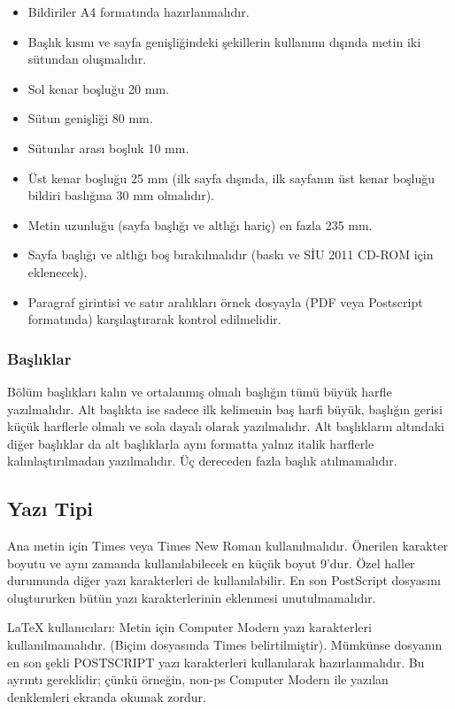 \documentclass{article}
\begin{document}
\begin{itemize}
\item Bildiriler A4 formatında hazırlanmalıdır.
\item Başlık kısmı ve sayfa genişliğindeki şekillerin kullanımı dışında metin iki sütundan oluşmalıdır.
\item Sol kenar boşluğu 20 mm.
\item Sütun genişliği 80 mm.
\item Sütunlar arası boşluk 10 mm.
\item Üst kenar boşluğu 25 mm (ilk sayfa dışında, ilk sayfanın üst
kenar boşluğu bildiri baslığına 30 mm olmalıdır).
\item Metin uzunluğu (sayfa başlığı ve altlığı hariç) en fazla 235 mm.
\item Sayfa başlığı ve altlığı boş bırakılmalıdır (baskı ve SİU 2011 CD-ROM için eklenecek).
\item Paragraf girintisi ve satır aralıkları örnek dosyayla
(PDF veya Postscript formatında) karşılaştırarak kontrol edilmelidir.
\end{itemize}


\subsubsection{Başlıklar}

Bölüm başlıkları kalın ve ortalanmış olmalı başlığın tümü büyük harfle
yazılmalıdır. Alt başlıkta ise sadece ilk kelimenin baş harfi büyük,
başlığın gerisi küçük harflerle olmalı ve sola dayalı olarak yazılmalıdır.
Alt başlıkların altındaki diğer başlıklar da alt başlıklarla aynı formatta
yalnız italik harflerle kalınlaştırılmadan yazılmalıdır. Üç dereceden fazla
başlık atılmamalıdır.


\subsection{Yazı Tipi}

Ana metin için Times veya Times New Roman kullanılmalıdır. Önerilen
karakter boyutu ve aynı zamanda kullanılabilecek en küçük boyut 9'dur.
Özel haller durumunda diğer yazı karakterleri de kullanılabilir.
En son PostScript dosyasını oluştururken bütün yazı karakterlerinin
eklenmesi unutulmamalıdır.

LaTeX kullanıcıları: Metin için Computer Modern yazı karakterleri
kullanılmamalıdır. (Biçim dosyasında Times belirtilmiştir). Mümkünse
dosyanın en son şekli POSTSCRIPT yazı karakterleri kullanılarak hazırlanmalıdır.
Bu ayrıntı gereklidir; çünkü örneğin, non-ps Computer Modern ile yazılan denklemleri
ekranda okumak zordur.
\end{document}

